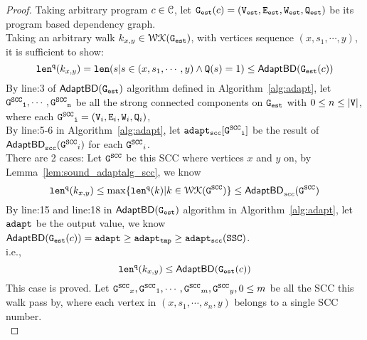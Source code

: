 \begin{proof}
  Taking arbitrary program $c \in \mathcal{C}$, let $\mathtt{{G_{est}}}(c) = (\mathtt{{V_{est}}}, \mathtt{{E_{est}}}, \mathtt{{W_{est}}}, \mathtt{{Q_{est}}})$ be its 
  program based dependency graph.
  \\
  Taking an arbitrary walk $k_{x,y} \in \mathcal{WK}{(\mathtt{{G_{est}}})}$, with vertices sequence
  $(x, s_1, \cdots, y)$, it is sufficient to show:
  \[
    \mathtt{len}^{\tt q}(k_{x,y}) = \mathtt{len}(s | s \in (x, s_1, \cdots, y) \land \mathtt{Q}(s) = 1) \leq \mathsf{AdaptBD}(\mathtt{{G_{est}}}(c))
  \]
  By line:3 of $\mathsf{AdaptBD}(\mathtt{{G_{est}}})$ algorithm defined in Algorithm~\ref{alg:adapt}, let $\mathtt{\mathtt{G^{SCC}}_1}, \cdots, \mathtt{\mathtt{G^{SCC}}_n}$ be all the strong connected components on $\mathtt{{G_{est}}}$ with $0 \leq n \leq |\mathtt{V}|$,
  where each $\mathtt{\mathtt{G^{SCC}}_i} = (\mathtt{V}_i, \mathtt{E}_i, \mathtt{W}_i, \mathtt{Q}_i)$,
  \\
  By line:5-6 in Algorithm~\ref{alg:adapt}, let $\mathtt{adapt_{scc}[\mathtt{G^{SCC}}_i]}$ be the result of $\mathsf{AdaptBD}_{\mathtt{scc}}(\mathtt{G^{SCC}}_i)$ for each $\mathtt{G^{SCC}}_i$.
  \\
  There are 2 cases:
  Let  $\mathtt{G^{SCC}}$ be this SCC where vertices $x$ and $y$ on, by Lemma~\ref{lem:sound_adaptalg_scc}, we know
  \[
    \mathtt{len}^{\tt q}(k_{x,y}) \leq \max\{\mathtt{len}^{\tt q}(k) | k \in \mathcal{WK}(\mathtt{G^{SCC}})\} \leq \mathsf{AdaptBD}_{scc}(\mathtt{G^{SCC}})
  \]
%
By line:15 and line:18 in $\mathsf{AdaptBD}(\mathtt{{G_{est}}})$ algorithm in Algorithm~\ref{alg:adapt}, 
let $\mathtt{adapt}$ be the output value,
we know $\mathsf{AdaptBD}(\mathtt{{G_{est}}}(c))  = \mathtt{adapt} \geq \mathtt{adapt_{tmp}} \geq  \mathtt{adapt_{scc}(SSC)} $.
\\
i.e., 
\[
  \mathtt{len}^{\tt q}(k_{x,y}) \leq \mathsf{AdaptBD}(\mathtt{{G_{est}}}(c)) 
  \]
This case is proved.
%
%
Let $\mathtt{G^{SCC}}_x, \mathtt{G^{SCC}}_1, \cdots, \mathtt{G^{SCC}}_m, \mathtt{G^{SCC}}_y, 0 \leq m$ be all the SCC this walk pass by, where each vertex in 
$(x, s_1, \cdots, s_n, y) $ belongs to a single SCC number. 
\\

\end{proof}
